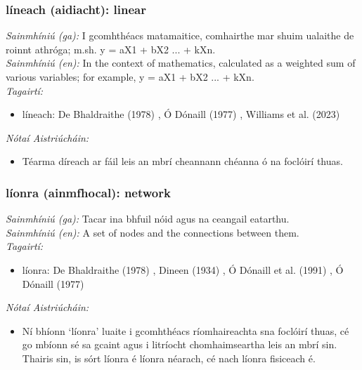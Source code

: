 \subsubsection*{líneach (aidiacht): linear}
 \noindent \textit{Sainmhíniú (ga):} I gcomhthéacs matamaitice, comhairthe mar shuim ualaithe de roinnt athróga; m.sh. y = aX1 + bX2 ... + kXn.
\\
 \noindent \textit{Sainmhíniú (en):} In the context of mathematics, calculated as a weighted sum of various variables; for example, y = aX1 + bX2 ... + kXn.
\\
 \noindent \textit{Tagairtí:}
\begin{itemize}
	\item líneach: De Bhaldraithe (1978) \cite{de-bhaldraithe}, Ó Dónaill (1977) \cite{odonaill}, Williams et al. (2023) \cite{storchiste}
\end{itemize}

 \noindent \textit{Nótaí Aistriúcháin:}
\begin{itemize}
	\item Téarma díreach ar fáil leis an mbrí cheannann chéanna ó na foclóirí thuas.
\end{itemize}


\subsubsection*{líonra (ainmfhocal): network}
 \noindent \textit{Sainmhíniú (ga):} Tacar ina bhfuil nóid agus na ceangail eatarthu.
\\
 \noindent \textit{Sainmhíniú (en):} A set of nodes and the connections between them.
\\
 \noindent \textit{Tagairtí:}
\begin{itemize}
	\item líonra: De Bhaldraithe (1978) \cite{de-bhaldraithe}, Dineen (1934) \cite{dineen}, Ó Dónaill et al. (1991) \cite{focloir-beag}, Ó Dónaill (1977) \cite{odonaill}
\end{itemize}

 \noindent \textit{Nótaí Aistriúcháin:}
\begin{itemize}
	\item Ní bhíonn `líonra' luaite i gcomhthéacs ríomhaireachta sna foclóirí thuas, cé go mbíonn sé sa gcaint agus i litríocht chomhaimseartha leis an mbrí sin. Thairis sin, is sórt líonra é líonra néarach, cé nach líonra fisiceach é.
\end{itemize}



